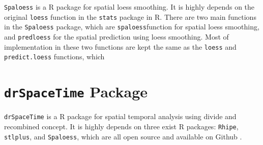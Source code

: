 \texttt{Spaloess} is a R package for spatial loess smoothing. It is highly 
depends on the original \texttt{loess} function in the \texttt{stats} package
in R. There are two main functions in the \texttt{Spaloess} package, which are
\texttt{spaloess}function for spatial loess smoothing, and \texttt{predloess} 
for the spatial prediction using loess smoothing. Most of implementation in these
two functions are kept the same as the \texttt{loess} and \texttt{predict.loess}
functions, which 

\section{\texttt{drSpaceTime} Package}

\texttt{drSpaceTime} is a R package for spatial temporal analysis using divide 
and recombined concept. It is highly depends on three exist R packages: 
\texttt{Rhipe}, \texttt{stlplus}, and \texttt{Spaloess}, which are all open 
source and available on Github \cite{github}.
